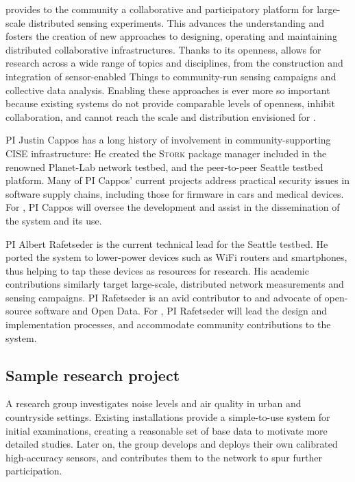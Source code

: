 \sysname provides to the community a collaborative and participatory
platform for large-scale distributed sensing experiments. This
advances the understanding and fosters the creation of new
approaches to designing, operating and maintaining distributed
collaborative infrastructures. Thanks to its openness, \sysname
allows for research across a wide range of topics and disciplines,
from the construction and integration of sensor-enabled Things
to community-run sensing campaigns and collective data analysis.
Enabling these approaches is ever more so important because
existing systems do not provide comparable levels of openness,
inhibit collaboration, and cannot reach the scale and distribution
envisioned for \sysname.

PI Justin Cappos has a long history of involvement in
community-supporting CISE infrastructure: He created the \textsc{Stork}
package manager included in the renowned Planet-Lab network testbed,
and the peer-to-peer Seattle testbed platform.
Many of PI Cappos' current projects address practical security issues
in software supply chains, including those for firmware in cars and
medical devices. For \sysname, PI Cappos will oversee the development
and assist in the dissemination of the system and its use.

PI Albert Rafetseder is the current technical lead for the Seattle
testbed. He ported the system to lower-power devices such as WiFi
routers and smartphones, thus helping to tap these devices as
resources for research.
His academic contributions similarly target large-scale, distributed
network measurements and sensing campaigns. PI Rafetseder is an avid
contributor to and advocate of open-source software and Open Data.
For \sysname, PI Rafetseder will lead the design and implementation
processes, and accommodate community contributions to the system.



\subsection{Sample research project}

A research group investigates noise levels and air quality in
urban and countryside settings. Existing \sysname installations
provide a simple-to-use system for initial examinations, creating
a reasonable set of base data to motivate more detailed studies.
Later on, the group develops and deploys their own calibrated
high-accuracy sensors, and contributes them to the \sysname network
to spur further participation.




